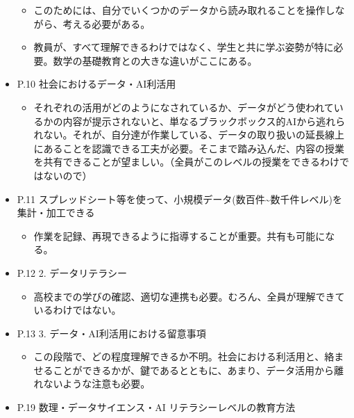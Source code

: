 \documentclass[
]{bxjsbook}
\providecommand{\tightlist}{%
  \setlength{\itemsep}{0pt}\setlength{\parskip}{0pt}}
\theoremstyle{definition}
\theoremstyle{definition}
\theoremstyle{definition}
\theoremstyle{definition}
\theoremstyle{remark}
\begin{document}
\begin{itemize}
  \begin{itemize}
  \tightlist
  \item
    このためには、自分でいくつかのデータから読み取れることを操作しながら、考える必要がある。
  \item
    教員が、すべて理解できるわけではなく、学生と共に学ぶ姿勢が特に必要。数学の基礎教育との大きな違いがここにある。
  \end{itemize}
\item
  P.10 社会におけるデータ・AI利活用

  \begin{itemize}
  \tightlist
  \item
    それぞれの活用がどのようになされているか、データがどう使われているかの内容が提示されないと、単なるブラックボックス的AIから逃れられない。それが、自分達が作業している、データの取り扱いの延長線上にあることを認識できる工夫が必要。そこまで踏み込んだ、内容の授業を共有できることが望ましい。（全員がこのレベルの授業をできるわけではないので）
  \end{itemize}
\item
  P.11 スプレッドシート等を使って、小規模データ(数百件\textasciitilde 数千件レベル)を集計・加工できる

  \begin{itemize}
  \tightlist
  \item
    作業を記録、再現できるように指導することが重要。共有も可能になる。
  \end{itemize}
\item
  P.12 2. データリテラシー

  \begin{itemize}
  \tightlist
  \item
    高校までの学びの確認、適切な連携も必要。むろん、全員が理解できているわけではない。
  \end{itemize}
\item
  P.13 3. データ・AI利活用における留意事項

  \begin{itemize}
  \tightlist
  \item
    この段階で、どの程度理解できるか不明。社会における利活用と、絡ませることができるかが、鍵であるとともに、あまり、データ活用から離れないような注意も必要。
  \end{itemize}
\item
  P.19 数理・データサイエンス・AI リテラシーレベルの教育方法


\end{itemize}
\end{document}
